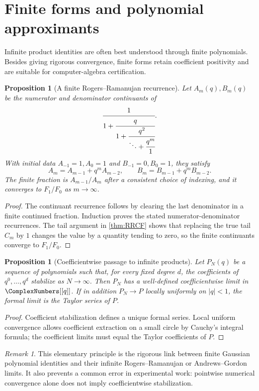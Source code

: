 \documentclass[11pt]{article}
\numberwithin{equation}{section}
\newtheorem{proposition}[theorem]{Proposition}
\theoremstyle{definition}
\theoremstyle{remark}
\newtheorem{remark}[theorem]{Remark}
\begin{document}
\section{Finite forms and polynomial approximants}

Infinite product identities are often best understood through finite
polynomials.  Besides giving rigorous convergence, finite forms retain
coefficient positivity and are suitable for computer-algebra certification.

\begin{proposition}[A finite Rogers--Ramanujan recurrence]\label{prop:finiteRR}
Let $A_m(q),B_m(q)$ be the numerator and denominator continuants of
\[
\cfrac1{1+\cfrac{q}{1+\cfrac{q^2}{\ddots+\cfrac{q^m}{1}}}}.
\]
With initial data $A_{-1}=1,A_0=1$ and $B_{-1}=0,B_0=1$, they satisfy
\begin{equation}\label{eq:continuants}
A_m=A_{m-1}+q^mA_{m-2},\qquad
B_m=B_{m-1}+q^mB_{m-2}.
\end{equation}
The finite fraction is $A_{m-1}/A_m$ after a consistent choice of indexing,
and it converges to $F_1/F_0$ as $m\to\infty$.
\end{proposition}
\begin{proof}
The continuant recurrence follows by clearing the last denominator in a
finite continued fraction.  Induction proves the stated numerator-denominator
recurrences.  The tail argument in \cref{thm:RRCF} shows that replacing the
true tail $C_m$ by $1$ changes the value by a quantity tending to zero, so the
finite continuants converge to $F_1/F_0$.
\end{proof}

\begin{proposition}[Coefficientwise passage to infinite products]\label{prop:coefflimit}
Let $P_N(q)$ be a sequence of polynomials such that, for every fixed degree
$d$, the coefficients of $q^0,\ldots,q^d$ stabilize as $N\to\infty$.  Then
$P_N$ has a well-defined coefficientwise limit in $\ComplexNumbers[[q]]$.  If in addition
$P_N\to P$ locally uniformly on $|q|<1$, the formal limit is the Taylor series
of $P$.
\end{proposition}
\begin{proof}
Coefficient stabilization defines a unique formal series.  Local uniform
convergence allows coefficient extraction on a small circle by Cauchy's
integral formula; the coefficient limits must equal the Taylor coefficients
of $P$.
\end{proof}

\begin{remark}
This elementary principle is the rigorous link between finite Gaussian
polynomial identities and their infinite Rogers--Ramanujan or
Andrews--Gordon limits.  It also prevents a common error in experimental
work: pointwise numerical convergence alone does not imply coefficientwise
stabilization.
\end{remark}
\end{document}

